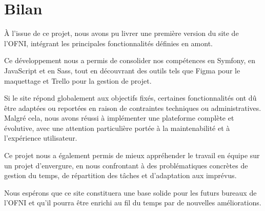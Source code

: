 \chapter{Bilan}

À l’issue de ce projet, nous avons pu livrer une première version du site de l’OFNI, intégrant les principales fonctionnalités définies en amont. 

Ce développement nous a permis de consolider nos compétences en Symfony, en JavaScript et en Sass, tout en découvrant des outils tels que Figma pour le maquettage et Trello pour la gestion de projet.
\bigskip

Si le site répond globalement aux objectifs fixés, certaines fonctionnalités ont dû être adaptées ou reportées en raison de contraintes techniques ou administratives. Malgré cela, nous avons réussi à implémenter une plateforme complète et évolutive, avec une attention particulière portée à la maintenabilité et à l’expérience utilisateur.
\bigskip

Ce projet nous a également permis de mieux appréhender le travail en équipe sur un projet d’envergure, en nous confrontant à des problématiques concrètes de gestion du temps, de répartition des tâches et d’adaptation aux imprévus. 
\bigskip

Nous espérons que ce site constituera une base solide pour les futurs bureaux de l’OFNI et qu’il pourra être enrichi au fil du temps par de nouvelles améliorations.
